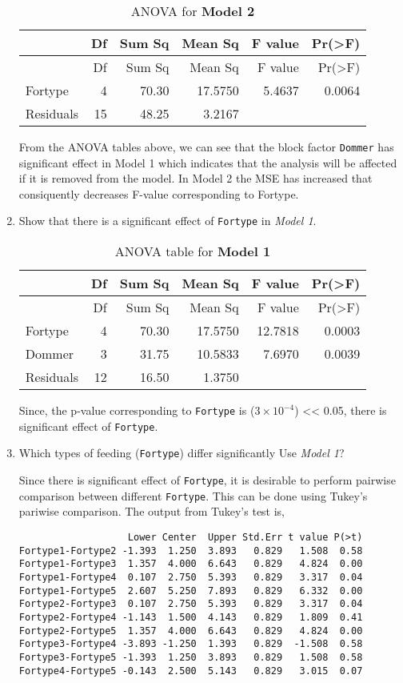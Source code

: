 \documentclass[11pt,a4paper]{article}
\begin{document}
\begin{enumerate}
  \begin{longtable}[c]{@{}lrrrrr@{}}
  \caption{ANOVA for \textbf{Model 2}}\tabularnewline
  \toprule
  & Df & Sum Sq & Mean Sq & F value & Pr(\textgreater{}F)\tabularnewline
  \midrule
  \endfirsthead
  \toprule
  & Df & Sum Sq & Mean Sq & F value & Pr(\textgreater{}F)\tabularnewline
  \midrule
  \endhead
  Fortype & 4 & 70.30 & 17.5750 & 5.4637 & 0.0064\tabularnewline
  Residuals & 15 & 48.25 & 3.2167 & &\tabularnewline
  \bottomrule
  \end{longtable}

  From the ANOVA tables above, we can see that the block factor
  \texttt{Dommer} has significant effect in Model 1 which indicates that
  the analysis will be affected if it is removed from the model. In
  Model 2 the MSE has increased that consiquently decreases F-value
  corresponding to Fortype.
\item
  Show that there is a significant effect of \texttt{Fortype} in
  \emph{Model 1}.

  \begin{longtable}[c]{@{}lrrrrr@{}}
  \caption{ANOVA table for \textbf{Model 1}}\tabularnewline
  \toprule
  & Df & Sum Sq & Mean Sq & F value & Pr(\textgreater{}F)\tabularnewline
  \midrule
  \endfirsthead
  \toprule
  & Df & Sum Sq & Mean Sq & F value & Pr(\textgreater{}F)\tabularnewline
  \midrule
  \endhead
  Fortype & 4 & 70.30 & 17.5750 & 12.7818 & 0.0003\tabularnewline
  Dommer & 3 & 31.75 & 10.5833 & 7.6970 & 0.0039\tabularnewline
  Residuals & 12 & 16.50 & 1.3750 & &\tabularnewline
  \bottomrule
  \end{longtable}

  Since, the p-value corresponding to \texttt{Fortype} is
  (\(3\times 10^{-4}\)) \textless{}\textless{} 0.05, there is
  significant effect of \texttt{Fortype}.
\item
  Which types of feeding (\texttt{Fortype}) differ significantly Use
  \emph{Model 1}?

  Since there is significant effect of \texttt{Fortype}, it is desirable
  to perform pairwise comparison between different \texttt{Fortype}.
  This can be done using Tukey's pariwise comparison. The output from
  Tukey's test is,

\begin{verbatim}
                   Lower Center  Upper Std.Err t value P(>t)
Fortype1-Fortype2 -1.393  1.250  3.893   0.829   1.508  0.58
Fortype1-Fortype3  1.357  4.000  6.643   0.829   4.824  0.00
Fortype1-Fortype4  0.107  2.750  5.393   0.829   3.317  0.04
Fortype1-Fortype5  2.607  5.250  7.893   0.829   6.332  0.00
Fortype2-Fortype3  0.107  2.750  5.393   0.829   3.317  0.04
Fortype2-Fortype4 -1.143  1.500  4.143   0.829   1.809  0.41
Fortype2-Fortype5  1.357  4.000  6.643   0.829   4.824  0.00
Fortype3-Fortype4 -3.893 -1.250  1.393   0.829  -1.508  0.58
Fortype3-Fortype5 -1.393  1.250  3.893   0.829   1.508  0.58
Fortype4-Fortype5 -0.143  2.500  5.143   0.829   3.015  0.07
\end{verbatim}


\end{enumerate}
\end{document}
